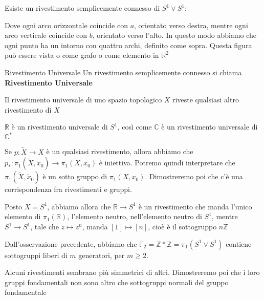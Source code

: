 \documentclass[11pt, a4paper, twoside]{article}
\begin{document}
\begin{es}
	Esiste un rivestimento semplicemente connesso di $S^1 \vee S^1$:
	\begin{center}
	\end{center}
	Dove ogni arco orizzontale coincide con $a$, orientato verso destra, mentre ogni arco verticale coincide con $b$, orientato verso l'alto. In questo modo abbiamo che ogni punto ha un intorno con quattro archi, definito come sopra. Questa figura può essere vista o come grafo o come elemento in $\mathbb R^2$
\end{es}

\begin{defn}{Rivestimento Universale}{}
	Un rivestimento semplicemente connesso si chiama \textbf{Rivestimento Universale}
\end{defn}

\begin{oss}
	Il rivestimento universale di uno spazio topologico $X$ riveste qualsiasi altro rivestimento di $X$
\end{oss}

\begin{es}
	$\mathbb R$ è un rivestimento universale di $S^1$, così come $\mathbb C$ è un rivestimento universale di $\mathbb C^*$
\end{es}

\begin{oss}
	Se $p:\tilde X \to X$ è un qualsiasi rivestimento, allora abbiamo che $p_*:\pi_1(\tilde X, \tilde x_0) \to \pi_1(X,x_0)$ è iniettiva. Potremo quindi interpretare che $\pi_1(\tilde X, \tilde x_0)$ è un sotto gruppo di $\pi_1(X,x_0)$. Dimostreremo poi che c'è una corrispondenza fra rivestimenti e gruppi.
\end{oss}

\begin{es}
	Posto $X = S^1$, abbiamo allora che $\mathbb R \to S^1$ è un rivestimento che manda l'unico elemento di $\pi_1(\mathbb R)$, l'elemento neutro, nell'elemento neutro di $S^1$, mentre $S^1 \to S^1$, tale che $z \mapsto z^n$, manda $[1] \mapsto [n]$, cioè è il sottogruppo $n \mathbb Z$
\end{es}

\begin{oss}
	Dall'osservazione precedente, abbiamo che $\mathbb F_2= \mathbb Z * \mathbb Z = \pi_1(S^1 \vee S^1)$ contiene sottogruppi liberi di $m$ generatori, per $m \geq 2$.
\end{oss}

\begin{oss}
	Alcuni rivestimenti sembrano più simmetrici di altri. Dimostreremo poi che i loro gruppi fondamentali non sono altro che sottogruppi normali del gruppo fondamentale
\end{oss}
\end{document}
